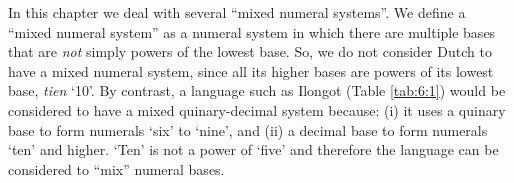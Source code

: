 In this chapter we deal with several ``mixed numeral systems''. We define a ``mixed numeral system'' as a numeral system in which there are multiple bases that are \textit{not} simply powers of the lowest base. So, we do not consider Dutch to have a mixed numeral system, since all its higher bases are powers of its lowest base, \textit{tien} `10'. By contrast, a language such as Ilongot (Table \ref{tab:6:1}) would be considered to have a mixed quinary-decimal system because: (i) it uses a quinary base to form numerals `six' to `nine', and (ii) a decimal base to form numerals `ten' and higher. `Ten' is not a power of `five' and therefore the language can be considered to ``mix'' numeral bases.




\begin{table}


\begin{tabular}{lr>{\it}lr>{\it}l}


\end{tabular}
\end{table}
